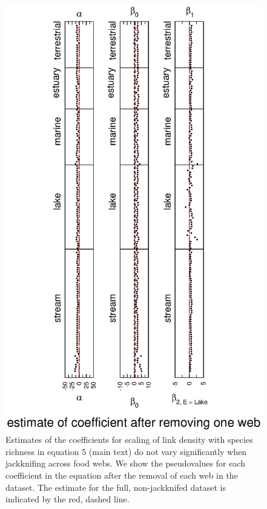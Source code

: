 \documentclass[12pt]{article}
\begin{document}
  \newpage

    \begin{figure}[!h]
    \centerline{\includegraphics*[height=.75\textheight]{Figures/Jackknife/LS_web.eps}}
    \caption{Estimates of the coefficients for scaling of link density with species richness
    in equation 5 (main text) do not vary significantly when jackknifing across food webs. 
    We show the pseudovalues for each coefficient in the equation after the removal of each 
    web in the dataset. The estimate for the full, non-jackknifed dataset is indicated by 
    the red, dashed line.}
    \label{LS_web}
    \end{figure}
\end{document}
